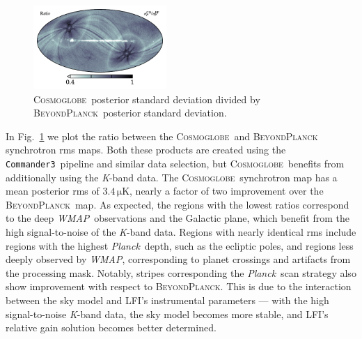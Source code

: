 \documentclass[twocolumn]{../../common/aa}
\def\WMAP{\emph{WMAP}}
\def\Planck{\emph{Planck}}
\def\commanderthree{\texttt{Commander3}}
\newcommand{\bp}{\textsc{BeyondPlanck}}
\newcommand{\cosmoglobe}{\textsc{Cosmoglobe}}
\newcommand{\K}[0]{\textit K}
\begin{document}


\begin{figure}
	\centering
	\includegraphics[width=0.45\textwidth]{figures/polint_sigma_ratio.pdf}
	\caption{
		\cosmoglobe\ posterior standard deviation divided by \bp\ posterior standard deviation.
		}
		\label{fig:rms_ratios}
\end{figure}

In Fig.~\ref{fig:rms_ratios} we plot the ratio between the \cosmoglobe\ and \bp\ \citep{bp01} synchrotron rms maps. Both these products are created using the \commanderthree\ pipeline and similar data selection, but \cosmoglobe\ benefits from additionally using the \K-band data. The \cosmoglobe\ synchrotron map has a mean posterior rms of $3.4\,\mathrm{\mu K}$, nearly a factor of two improvement over the \bp\ map.
As expected, the regions with the lowest ratios correspond to the deep \WMAP\ observations and the Galactic plane, which benefit from the high signal-to-noise of the \K-band data. Regions with nearly identical rms include regions with the highest \Planck\ depth, such as the ecliptic poles, and regions less deeply observed by \WMAP, corresponding to planet crossings and artifacts from the processing mask. Notably, stripes corresponding the \Planck\ scan strategy also show improvement with respect to \bp. This is due to the interaction between the sky model and LFI's instrumental parameters --- with the high signal-to-noise \K-band data, the sky model becomes more stable, and LFI's relative gain solution becomes better determined.
\end{document}
